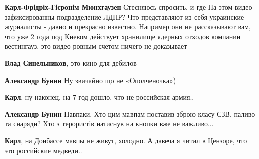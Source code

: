 \begin{itemize}
\begin{itemize}
\textbf{Карл-Фрідріх-Гієронім Мюнхгаузен} Стесняюсь спросить, и где На этом видео зафиксированны подразделение ЛДНР? Что представляют из себя украинские журналисты - давно и прекрасно известно. Например они не рассказывают вам, что уже 2 года под Киевом действует хранилище ядерных отходов компании вестингауз. это видео ровным счетом ничего не доказывает

 
\textbf{Влад Синельников}, это кино для дебилов

 
\textbf{Александр Бунин} Ну звичайно що не «Ополченочка»)

 
\textbf{Карл}, ну наконец, на 7 год дошло, что не российская армия..

 
\textbf{Александр Бунин} Навпаки. Хто цим мавпам поставив зброю класу СЗВ, паливо та снаряди? Хто з терористів натиснув на кнопки вже не важливо...

 
\textbf{Карл}, на Донбассе мавпы не живут, холодно. А давеча я читал в Цензоре, что это российские медведи..

 

\end{itemize}
\end{itemize}
